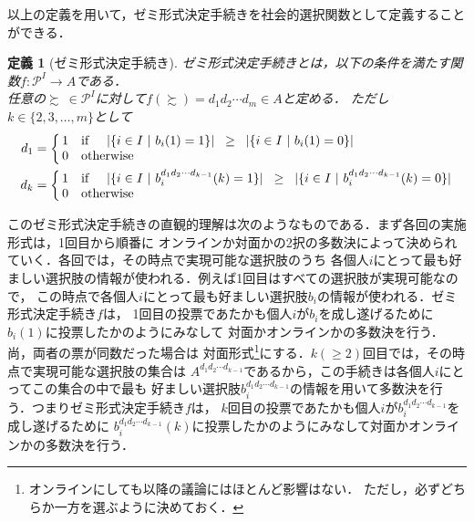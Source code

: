 \documentclass[dvipdfmx]{jsarticle}
\newtheorem{definition}{定義}[section]
\begin{document}
以上の定義を用いて，ゼミ形式決定手続きを社会的選択関数として定義することができる．
\begin{definition}[ゼミ形式決定手続き]\label{def:ゼミ形式決定手続き}
  ゼミ形式決定手続きとは，以下の条件を満たす関数$f\colon \mathcal{P}^I \to A$である．\\
  任意の$\succsim \ \in \mathcal{P}^I$に対して$f(\succsim) = d_{1}d_{2}\cdots d_{m} \in A$と定める．
  ただし$k \in \{2,3,\ldots,m\}$として
  \begin{align*}
      d_{1}
    &= \left\{ \begin{array}{@{\,}rl@{}}
      1 & \textup{if}\hspace{5mm}  |\{i \in I\ |\ b_i(1) = 1\}| \hspace{2mm} \geq \hspace{2mm} |\{i \in I\ |\ b_i(1) = 0\}| \\
      0 & \textup{otherwise}
    \end{array} \right. \\
      d_{k}
    &= \left\{ \begin{array}{@{\,}rl@{}}
      1 & \textup{if}\hspace{5mm}  |\{i \in I\ |\ b_i^{d_{1}d_{2}\cdots d_{k-1}}(k) = 1\}| \hspace{2mm}
      \geq \hspace{2mm} |\{i \in I\ |\ b_i^{d_{1}d_{2}\cdots d_{k-1}}(k) = 0\}| \\
      0 & \textup{otherwise}
    \end{array} \right.
  \end{align*}
\end{definition}

このゼミ形式決定手続きの直観的理解は次のようなものである．まず各回の実施形式は，1回目から順番に
オンラインか対面かの2択の多数決によって決められていく．各回では，その時点で実現可能な選択肢のうち
各個人$i$にとって最も好ましい選択肢の情報が使われる．例えば1回目はすべての選択肢が実現可能なので，
この時点で各個人$i$にとって最も好ましい選択肢$b_i$の情報が使われる．ゼミ形式決定手続き$f$は，
1回目の投票であたかも個人$i$が$b_i$を成し遂げるために$b_{i}(1)$に投票したかのようにみなして
対面かオンラインかの多数決を行う．尚，両者の票が同数だった場合は
対面形式\footnote{オンラインにしても以降の議論にはほとんど影響はない．
ただし，必ずどちらか一方を選ぶように決めておく．}にする．$k(\geq 2)$回目では，その時点で実現可能な選択肢の集合は
$A^{d_{1}d_{2}\cdots d_{k-1}}$であるから，この手続きは各個人$i$にとってこの集合の中で最も
好ましい選択肢$b_i^{d_{1}d_{2}\cdots d_{k-1}}$の情報を用いて多数決を行う．つまりゼミ形式決定手続き$f$は，
$k$回目の投票であたかも個人$i$が$b_i^{d_{1}d_{2}\cdots d_{k-1}}$を成し遂げるために
$b_i^{d_{1}d_{2}\cdots d_{k-1}}(k)$に投票したかのようにみなして対面かオンラインかの多数決を行う．
\end{document}
